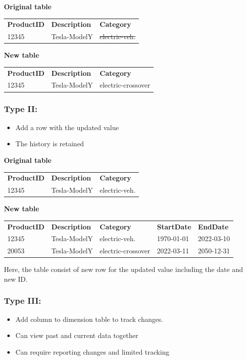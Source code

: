 \textbf{Original table} \\
\begin{tabular}{lll}
    \textbf{ProductID} & \textbf{Description} & \textbf{Category} \\
    12345 & Tesla-ModelY & \st{electric-veh.}
\end{tabular}

\textbf{New table} \\
\begin{tabular}{lll}
    \textbf{ProductID} & \textbf{Description} & \textbf{Category} \\
    12345 & Tesla-ModelY & electric-crossover
\end{tabular}

\subsubsection{Type II:}
\begin{itemize}
    \item Add a row with the updated value
    \item The history is retained
\end{itemize}

\textbf{Original table} \\
\begin{tabular}{lll}
    \textbf{ProductID} & \textbf{Description} & \textbf{Category} \\
    12345 & Tesla-ModelY & electric-veh.
\end{tabular}

\textbf{New table} \\
\begin{tabular}{lllll}
    \textbf{ProductID} & \textbf{Description} & \textbf{Category} & \textbf{StartDate} & \textbf{EndDate} \\
    12345 & Tesla-ModelY & electric-veh. & 1970-01-01 & 2022-03-10 \\
    20053 & Tesla-ModelY & electric-crossover & 2022-03-11 & 2050-12-31 
\end{tabular}

Here, the table consist of new row for the updated value including the date and new ID.

\subsubsection{Type III:}
\begin{itemize}
    \item Add column to dimension table to track changes.
    \item Can view past and current data together
    \item Can require reporting changes and limited tracking
\end{itemize}

